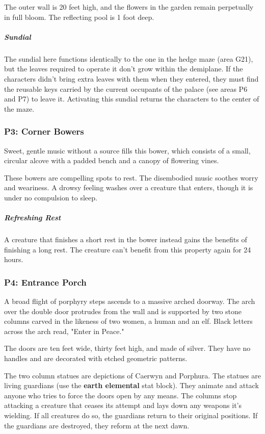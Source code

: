 \documentclass[10pt,a4paper,twoside,bg=print,twocolumn,openany,nodeprecatedcode]{dndbook}
\begin{document}
The outer wall is 20 feet high, and the flowers in the garden remain perpetually in full bloom. The reflecting pool is 1 foot deep.

\subparagraph{Sundial}
The sundial here functions identically to the one in the hedge maze (area G21), but the leaves required to operate it don't grow within the demiplane. If the characters didn't bring extra leaves with them when they entered, they must find the reusable keys carried by the current occupants of the palace (see areas P6 and P7) to leave it. Activating this sundial returns the characters to the center of the maze.

\subsubsection{P3: Corner Bowers}
\begin{DndReadAloud}{}
Sweet, gentle music without a source fills this bower, which consists of a small, circular alcove with a padded bench and a canopy of flowering vines.

\end{DndReadAloud}

These bowers are compelling spots to rest. The disembodied music soothes worry and weariness. A drowsy feeling washes over a creature that enters, though it is under no compulsion to sleep.

\subparagraph{Refreshing Rest}
A creature that finishes a short rest in the bower instead gains the benefits of finishing a long rest. The creature can't benefit from this property again for 24 hours.

\subsubsection{P4: Entrance Porch}
\begin{DndReadAloud}{}
A broad flight of porphyry steps ascends to a massive arched doorway. The arch over the double door protrudes from the wall and is supported by two stone columns carved in the likeness of two women, a human and an elf. Black letters across the arch read, "Enter in Peace."

The doors are ten feet wide, thirty feet high, and made of silver. They have no handles and are decorated with etched geometric patterns.

\end{DndReadAloud}

The two column statues are depictions of Caerwyn and Porphura. The statues are living guardians (use the \textbf{earth elemental} stat block). They animate and attack anyone who tries to force the doors open by any means. The columns stop attacking a creature that ceases its attempt and lays down any weapons it's wielding. If all creatures do so, the guardians return to their original positions. If the guardians are destroyed, they reform at the next dawn.
\end{document}
